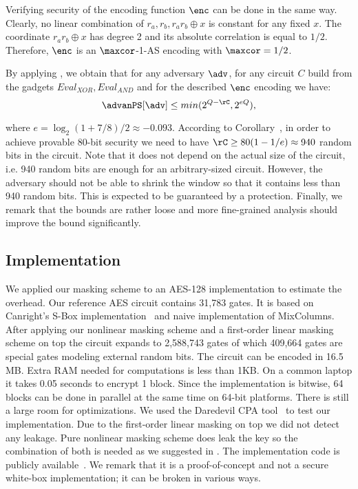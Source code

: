 Verifying security of the encoding function $\enc$ can be done in the same way. Clearly, no linear combination of $r_a,r_b,r_ar_b\oplus x$ is constant for any fixed $x$. The coordinate $r_ar_b\oplus x$ has degree 2 and its absolute correlation is equal to $1/2$. Therefore, $\enc$ is an $\maxcor$-1-AS encoding with $\maxcor=1/2$.

By applying , we obtain that for any adversary $\adv$, for any circuit $C$ build from the gadgets $Eval_{XOR}, Eval_{AND}$ and for the described $\enc$ encoding we have:
\begin{equation}
    \advanPS[\adv] \le min(2^{Q-\rC}, 2^{eQ}),
\end{equation}

where $e = \log_2{(1+7/8)/2}\approx -0.093$. According to Corollary~, in order to achieve provable 80-bit security we need to have $\rC \ge 80(1 - 1/e) \approx 940$ random bits in the circuit. Note that it does not depend on the actual size of the circuit, i.e. 940 random bits are enough for an arbitrary-sized circuit. However, the adversary should not be able to shrink the window so that it contains less than 940 random bits. This is expected to be guaranteed by a \SH{} protection. Finally, we remark that the bounds are rather loose and more fine-grained analysis should improve the bound significantly.


\subsection{Implementation}

We applied our masking scheme to an AES-128 implementation to estimate the overhead. Our reference AES circuit contains 31,783 gates. It is based on Canright's S-Box implementation~\cite{Canright} and naive implementation of MixColumns. After applying our nonlinear masking scheme and a first-order linear masking scheme on top the circuit expands to 2,588,743 gates of which 409,664 gates are special gates modeling external random bits. The circuit can be encoded in 16.5 MB. Extra RAM needed for computations is less than 1KB. On a common laptop it takes 0.05 seconds to encrypt 1 block. Since the implementation is bitwise, 64 blocks can be done in parallel at the same time on 64-bit platforms. There is still a large room for optimizations. We used the Daredevil CPA tool~\cite{SCM} to test our implementation. Due to the first-order linear masking on top we did not detect any leakage. Pure nonlinear masking scheme does leak the key so the combination of both is needed as we suggested in . The implementation code is publicly available~\cite{OurWhiteboxCode}. We remark that it is a proof-of-concept and not a secure white-box implementation; it can be broken in various ways.